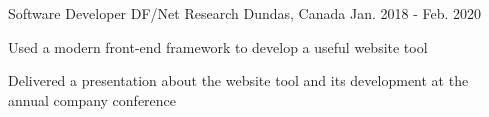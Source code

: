

\begin{cventries}

  \cventry
{Software Developer} %
{DF/Net Research} %
{Dundas, Canada} %
{Jan. 2018 - Feb. 2020} %
{\begin{cvitems}
		\item
		{Used a modern front-end framework to develop a useful website tool}
		\item
		{Delivered a presentation about the website tool and its development at the annual company conference}
	\end{cvitems}
}

	




\end{cventries}
